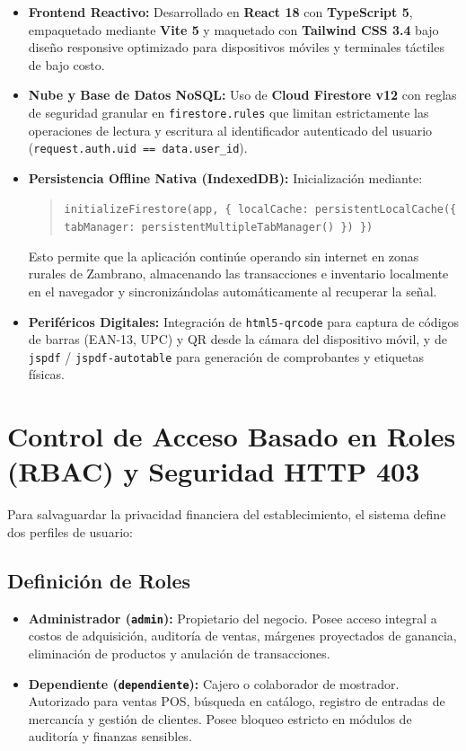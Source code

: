 \documentclass[12pt,a4paper]{article}
\begin{document}
\begin{itemize}
    \item \textbf{Frontend Reactivo:} Desarrollado en \textbf{React 18} con \textbf{TypeScript 5}, empaquetado mediante \textbf{Vite 5} y maquetado con \textbf{Tailwind CSS 3.4} bajo diseño responsive optimizado para dispositivos móviles y terminales táctiles de bajo costo.
    \item \textbf{Nube y Base de Datos NoSQL:} Uso de \textbf{Cloud Firestore v12} con reglas de seguridad granular en \texttt{firestore.rules} que limitan estrictamente las operaciones de lectura y escritura al identificador autenticado del usuario (\texttt{request.auth.uid == data.user\_id}).
    \item \textbf{Persistencia Offline Nativa (IndexedDB):} Inicialización mediante:
    \begin{quote}
    \texttt{initializeFirestore(app, \{ localCache: persistentLocalCache(\{ tabManager: persistentMultipleTabManager() \}) \})}
    \end{quote}
    Esto permite que la aplicación continúe operando sin internet en zonas rurales de Zambrano, almacenando las transacciones e inventario localmente en el navegador y sincronizándolas automáticamente al recuperar la señal.
    \item \textbf{Periféricos Digitales:} Integración de \texttt{html5-qrcode} para captura de códigos de barras (EAN-13, UPC) y QR desde la cámara del dispositivo móvil, y de \texttt{jspdf} / \texttt{jspdf-autotable} para generación de comprobantes y etiquetas físicas.
\end{itemize}

\section{Control de Acceso Basado en Roles (RBAC) y Seguridad HTTP 403}

Para salvaguardar la privacidad financiera del establecimiento, el sistema define dos perfiles de usuario:

\subsection{Definición de Roles}
\begin{itemize}
    \item \textbf{Administrador (\texttt{admin}):} Propietario del negocio. Posee acceso integral a costos de adquisición, auditoría de ventas, márgenes proyectados de ganancia, eliminación de productos y anulación de transacciones.
    \item \textbf{Dependiente (\texttt{dependiente}):} Cajero o colaborador de mostrador. Autorizado para ventas POS, búsqueda en catálogo, registro de entradas de mercancía y gestión de clientes. Posee bloqueo estricto en módulos de auditoría y finanzas sensibles.
\end{itemize}
\end{document}

